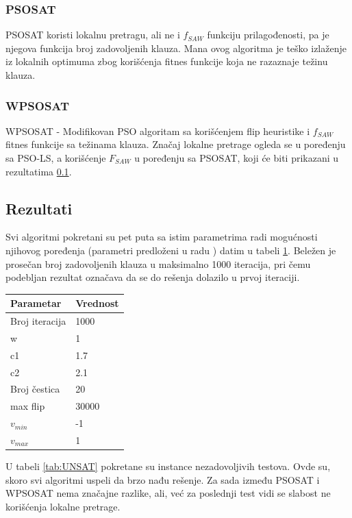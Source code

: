 \documentclass[a4paper]{article}
\begin{document}
\subsubsection{PSOSAT}
\label{sec:psosat}
PSOSAT koristi lokalnu pretragu, ali ne i $f_{SAW}$ funkciju prilagođenosti, 
pa je njegova funkcija broj zadovoljenih klauza. Mana ovog algoritma je teško izlaženje
iz lokalnih optimuma zbog korišćenja fitnes funkcije koja ne razaznaje težinu klauza.

\subsubsection{WPSOSAT}
\label{sec:wpsosat}
WPSOSAT - Modifikovan PSO algoritam sa korišćenjem flip heuristike i $f_{SAW}$ fitnes
funkcije sa težinama klauza. Značaj lokalne pretrage ogleda se u poređenju sa PSO-LS, 
a korišćenje $F_{SAW}$ u poređenju sa PSOSAT, koji će biti prikazani u rezultatima 
\ref{sec:pso_rezultati}.


\subsection{Rezultati}
\label{sec:pso_rezultati}
Svi algoritmi pokretani su pet puta sa istim parametrima radi mogućnosti njihovog
poređenja (parametri predloženi u radu \cite{pso_layeb}) datim u tabeli
\ref{tab:pso_parametri}. 
Beležen je prosečan broj zadovoljenih klauza u maksimalno 1000 iteracija,
pri čemu podebljan rezultat označava da se do rešenja dolazilo u
prvoj iteraciji.\\

\begin{table}[h!]
\centering
{}\label{tab:pso_parametri} 
\begin{tabular}{ |p{3cm}|p{2cm}| }
 \hline
 Parametar 	& Vrednost \\ 
 \hline
 Broj iteracija & 1000 \\
 w & 1 \\
 c1 & 1.7 \\
 c2 & 2.1 \\
 Broj čestica	& 20 \\
 max flip & 30000 \\
 $v_{min}$ & -1 \\
 $v_{max}$ & 1\\ 
 \hline
\end{tabular}
\end{table}

U tabeli \ref{tab:UNSAT} pokretane su instance nezadovoljivih testova. 
Ovde su, skoro svi algoritmi uspeli da brzo nađu rešenje. 
Za sada između PSOSAT i WPSOSAT nema značajne razlike, ali, već
za poslednji test vidi se slabost ne korišćenja lokalne pretrage.\\
\end{document}
